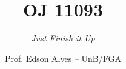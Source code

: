 \title{OJ 11093}
\subtitle{\textit{Just Finish it Up}}
\author{Prof. Edson Alves -- UnB/FGA}
\date{}
